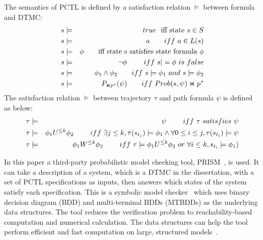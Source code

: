 The semantics of PCTL is defined by a satisfaction relation $\models$ between formula and DTMC:
\begin{eqnarray}
\centering
s&\models& true\ \ \text{iff state $s\in S$}\\
s&\models& a\qquad iff\ a\in L(s)\\
s&\models& \phi\qquad \text{iff state s satisfies state formula $\phi$}\\
s&\models& \neg\phi\qquad\ iff\ s|=\phi\ is\ false\\
s&\models& \phi_1\wedge\phi_2\qquad iff\ s\models\phi_1\ and\ s\models\phi_2\\
s&\models& P_{\Join p^*}(\psi)\qquad iff\ Prob(s, \psi)\Join p^*%
\end{eqnarray} 
The satisfaction relation $\models$ between trajectory $\tau$ and path formula $\psi$ is defined as below:
\begin{eqnarray}
\centering
\tau&\models& \psi\qquad\ iff\ \tau\ satisfies\ \psi\\
\tau&\models& \phi_1 U^{\leq k}\phi_2\qquad\ iff\ \exists j\leq k, \tau(s_{t_j})\models \phi_1 \wedge \forall 0\leq i\leq j, \tau(s_{t_i})\models \psi\\
\tau&\models& \phi_1 W^{\leq k}\phi_2\qquad\ iff\ \tau \models \phi_1 U^{\leq k}\phi_2\ or\ \forall i\leq k, s_{t_i}\models \phi_1)
\end{eqnarray} 

In this paper a third-party probabilistic model checking tool, PRISM~\cite{kwiatkowska2002prism}, is used. It can take a description of a system, which is a DTMC in the dissertation, with a set of PCTL specifications as inputs, then answers which states of the system satisfy each specification. This is a symbolic model checker~\cite{fujita1997multi} which uses binary decision diagram (BDD) and multi-terminal BDDs (MTBDDs) as the underlying data structures. The tool reduces the verification problem to reachability-based computation and numerical calculation. The data structures can help the tool perform efficient and fast computation on large, structured models~\cite{kwiatkowska2002prism}. 

